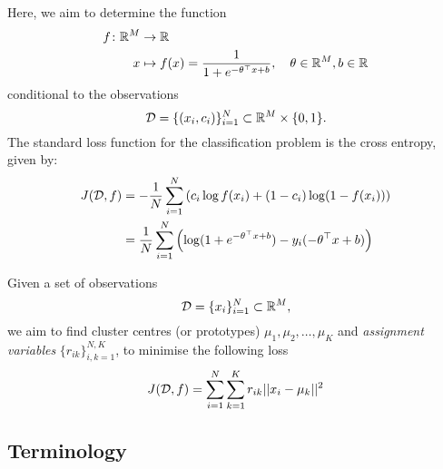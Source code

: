 \begin{mdframed}[style=ejemplo, frametitle={\center Example: Logistic regression}]

Here, we aim to determine the function
\begin{align}
  f \colon \mathbb{R}^M &\to \mathbb{R}\nonumber\\
  x &\mapsto f(x)= \frac{1}{1 + e^{-\theta^\top x+b}},\quad \theta\in\mathbb{R}^M, b\in\mathbb{R}
   \label{eq:log_reg_fn} 
\end{align}
conditional to the  observations
\begin{equation}
	{\mathcal D}=\{(x_i,c_i)\}_{i=1}^N\subset \mathbb{R}^M \times \{0,1\}.
	\label{eq:training_set_classif}
\end{equation}
 The standard loss function for the classification problem is the cross entropy, given by:
\begin{align}
	J({\mathcal D},f) &= -\frac{1}{N} \sum_{i=1}^N \left(c_i\log f(x_i) + (1-c_i)\log(1-f(x_i))\right)\\
				&=  \frac{1}{N} \sum_{i=1}^N \left( \log(1+e^{-\theta^\top x+b}) -y_i(-\theta^\top x+b)  \right)
	\label{eq:x_entropy_cost}
\end{align}

\end{mdframed}



\begin{mdframed}[style=ejemplo, frametitle={\center Example: Clustering (K-means)}]

Given a set of observations
\begin{equation}
	{\mathcal D}=\{x_i\}_{i=1}^N\subset \mathbb{R}^M,
	\label{eq:training_set_clustering}
\end{equation}
we aim to find cluster centres (or prototypes) $\mu_1,\mu_2,\ldots, \mu_K$ and \emph{assignment variables} $\{r_{ik}\}_{i,k=1}^{N,K}$, to minimise the following loss 
\begin{align}
	J({\mathcal D},f) = \sum_{i=1}^N\sum_{k=1}^K r_{ik} ||x_i-\mu_k||^2\\
	\label{eq:clustering_cost} 
\end{align}

\end{mdframed}

\subsection{Terminology} %
\label{sub:opt_terminology}

